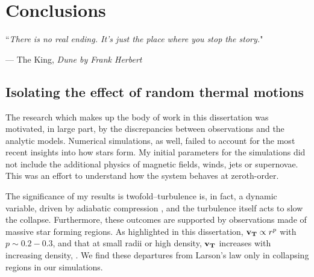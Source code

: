 \documentclass[../dissertation.tex]{subfiles}
\begin{document}
\chapter{Conclusions}
\label{ch:conclusions}

\singlespace
\epigraph{``\emph{There is no real ending. It's just the place where you stop the story.}"}{--- \textup{The King}, \textit{Dune by Frank Herbert}}

\dblspace


\section{Isolating the effect of random thermal motions}

The research which makes up the body of work in this dissertation was motivated, in large part, 
by the discrepancies between observations and the analytic models. 
Numerical simulations, as well, failed to account for the most recent insights into how stars form. 
My initial parameters for the simulations did not include the additional physics of magnetic fields, winds, jets or supernovae. 
This was an effort to understand how the system behaves at zeroth-order. 

The significance of my results is twofold--turbulence is, in fact, a dynamic variable, driven by adiabatic compression \citep{2012ApJ...750L..31R}, 
and the turbulence itself acts to slow the collapse. 
Furthermore, these outcomes are supported by observations made of massive star forming regions. 
As highlighted in this dissertation,  $\mathbf{v_T} \propto r^p$ with $ p \sim 0.2-0.3$, and that at small radii or high density, $\mathbf{v_T}$  
increases with increasing density, \citep{1997ApJ...476..730P}. 
We find these departures from Larson's law only in collapsing regions in our simulations. 
\end{document}
